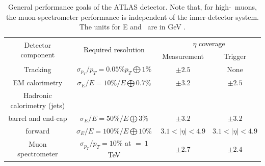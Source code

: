 \begin{table}[thb]
	\centering
	\small
	\setlength\tabcolsep{5pt} 
	\begin{tabular}{|c|c|c|c| }
	\hline
	\multirow{2}{*}{Detector component}&\multirow{2}{*}{Required resolution} & \multicolumn{2}{c|}{$\eta$ coverage} \\ \cline{3-4}
	
	  & & Measurement &  Trigger\\ 
	 \hline
	Tracking         &    $\sigma_{p_T}/p_T = 0.05\%p_T\bigoplus 1\% $        &  $\pm 2.5$  & None \\  
	\hline
	EM calorimetry      &  $\sigma_E/E = 10\%/E\bigoplus 0.7\% $       & $\pm 3.2$ &  $\pm 2.5$\\
	\hline
	Hadronic calorimetry (jets)   &        & &      \\
	\hline
	barrel and end-cap &  $\sigma_E/E = 50\%/E\bigoplus 3\% $       & $\pm 3.2$ &  $\pm 3.2$\\
	forward   &  $\sigma_E/E = 100\%/E\bigoplus 10\% $       & $ 3.1 < |\eta | < 4.9 $ &  $3.1 < |\eta | < 4.9 $\\
	\hline
	Muon spectrometer  &    $\sigma_{p_T}/p_T = 10\%$ at \pt $=\ 1$ TeV        &  $\pm 2.7$  & $\pm 2.4$ \\  
	\hline
	\end{tabular}
	\vspace{0.2cm}
	\caption{General performance goals of the ATLAS detector. Note that, for high-\pt\ muons,
	the muon-spectrometer performance is independent of the inner-detector system. The units for E
	and \pt\ are in GeV \cite{PERF-2007-01}.}
	\label{tab:ATLAS_performance}
\end{table}




